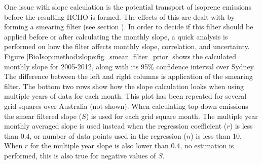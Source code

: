     One issue with slope calculation is the potential transport of isoprene emissions before the resulting HCHO is formed.
    The effects of this are dealt with by forming a smearing filter (see section ).
    In order to decide if this filter should be applied before or after calculating the monthly slope, a quick analysis is performed on how the filter affects monthly slope, correlation, and uncertainty.
    Figure \ref{BioIsop:method:slope:fig_smear_filter_prior} shows the calculated monthly slope for 2005-2012, along with its 95\% confidence interval over Sydney.
    The difference between the left and right columns is application of the smearing filter.
    The bottom two rows show how the slope calculation looks when using multiple years of data for each month.
    This plot has been repeated for several grid squares over Australia (not shown).
    When calculating top-down emissions the smear filtered slope ($S$) is used for each grid square month.
    The multiple year monthly averaged slope is used instead when the regression coefficient ($r$) is less than 0.4, or number of data points used in the regression ($n$) is less than 10.
    When $r$ for the multiple year slope is also lower than 0.4, no estimation is performed, this is also true for negative values of $S$.
    
    
    
